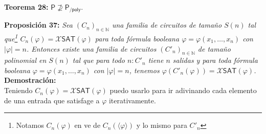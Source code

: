 \documentclass{article}
\begin{document}
\begin{flushleft}
  \textbf{Teorema 28:}
  $\mathsf{P \nsupseteq P_{/poly}}$.
\end{flushleft}

\begin{flushleft}
  \textbf{Proposición 37:}
  \textit{Sea $(C_n)_{n \in \mathbb{N}}$ una familia de circuitos de tamaño $S(n)$ tal que\footnote{Notamos
  $C_n(\varphi)$ en ve de $C_n(\langle \varphi \rangle)$ y lo mismo para $C'_n$} $C_n(\varphi) = \mathcal{X}
  \mathsf{SAT}(\varphi)$ para toda fórmula booleana $\varphi = \varphi(x_1, \dots , x_n)$ con $|\varphi| = n$.
  Entonces existe una familia de circuitos $(C'_n)_{n \in \mathbb{N}}$ de tamaño polinomial en $S(n)$ tal que
  para todo $n: C'_n$ tiene $n$ salidas y para toda fórmula booleana $\varphi = \varphi(x_1, \dots, x_n)$ 
  con $|\varphi| = n$, tenemos $\varphi(C'_n(\varphi)) = \mathcal{X}\mathsf{SAT}(\varphi)$.} \\[0.5em]

  \textbf{\textcolor{Mulberry}{Demostración:}} \\[0.5em]

  Teniendo $C_n(\varphi) = \mathcal{X}\mathsf{SAT}(\varphi)$ puedo usarlo para ir adivinando cada elemento de una entrada
  que satisfage a $\varphi$ iterativamente.
\end{flushleft}
\end{document}
